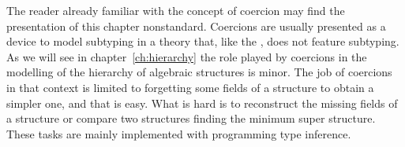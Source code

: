 %
%

The reader already familiar with the concept of coercion
may find the presentation of this chapter nonstandard.
Coercions are usually presented as a device to model
subtyping in a theory that, like the \mcbCIC{}, does not
feature subtyping.  As we will see in chapter~\ref{ch:hierarchy}
the role played by coercions in the modelling of the hierarchy
of algebraic structures is minor.  The job of
coercions in that context is limited to
forgetting some fields of a structure to obtain a simpler one, and
that is easy.  What
is hard is to reconstruct the missing fields of a structure
or compare two structures finding the minimum super structure.
These tasks are mainly implemented with programming type inference.

